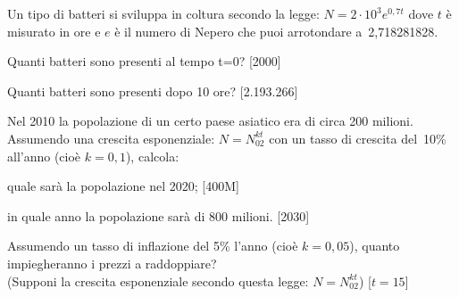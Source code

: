 \begin{esercizio}
\label{ese:esp_log}
Un tipo di batteri si sviluppa in coltura secondo la legge:
\(N=2 \cdot 10^3 e^{0,7t}\)
dove \(t\) è misurato in ore e \(e\) è il numero di Nepero che puoi 
arrotondare a~2,718281828.
\begin{enumeratea}
 \item Quanti batteri sono presenti al tempo t=0? \hfill [2000]
 \item Quanti batteri sono presenti dopo 10 ore? \hfill [2.193.266]
\end{enumeratea}
\end{esercizio}

\begin{esercizio}
\label{ese:esp_log}
Nel 2010 la popolazione di un certo paese asiatico era di circa 200 
milioni. Assumendo una crescita esponenziale:
\(N=N_02^{kt}\)
con un tasso di crescita del~10\% all’anno (cioè \(k=0,1\)), calcola: 
\begin{enumeratea}
 \item quale sarà la popolazione nel 2020; \hfill [400M]
 \item in quale anno la popolazione sarà di 800 milioni. \hfill [2030]
\end{enumeratea}
\end{esercizio}

\begin{esercizio}
\label{ese:esp_log}
Assumendo un tasso di inflazione del 5\% l’anno (cioè \(k=0,05\)), quanto 
impiegheranno i prezzi a raddoppiare?\\
(Supponi la crescita esponenziale secondo questa legge: \(N=N_02^{kt}\))
\hfill [\(t=15\)]
\end{esercizio}



